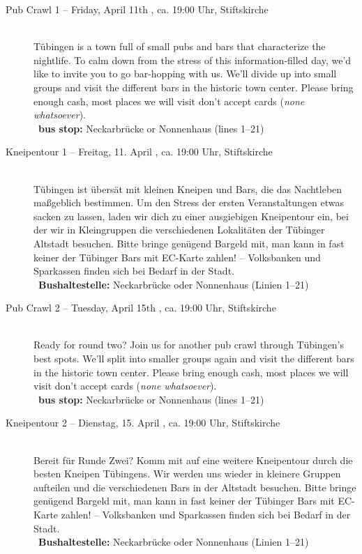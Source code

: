 \begin{description}
\ifmaster \iflehramt \pagebreak \fi \fi
\ifmaster \ifkogwiss \pagebreak \fi \fi

\ifml
    \item[Pub Crawl 1 -- Friday, April 11th \YEAR, ca. 19:00 Uhr, Stiftskirche]~\\
    Tübingen is a town full of small pubs and bars that characterize the nightlife.
    To calm down from the stress of this information-filled day, we'd like to invite you to go bar-hopping with us.
    We'll divide up into small groups and visit the different bars in the historic town center.
    Please bring enough cash, most places we will visit don't accept cards (\emph{none whatsoever}). \\
    ~\textbf{bus stop:} Neckarbrücke or Nonnenhaus (lines 1--21)
\else
    \item[Kneipentour 1 -- Freitag, 11. April \YEAR, ca. 19:00 Uhr, Stiftskirche]~\\
    Tübingen ist übersät mit kleinen Kneipen und Bars, die das Nachtleben maßgeblich bestimmen.
    Um den Stress der ersten Veranstaltungen etwas sacken zu lassen, laden wir dich zu einer ausgiebigen Kneipentour ein,
    bei der wir in Kleingruppen die verschiedenen Lokalitäten der Tübinger Altstadt besuchen.
    Bitte bringe genügend Bargeld mit, man kann in fast keiner der Tübinger Bars mit EC-Karte zahlen! -- Volksbanken und Sparkassen finden sich bei Bedarf in der Stadt.\\
   ~\textbf{Bushaltestelle:} Neckarbrücke oder Nonnenhaus (Linien 1--21)
\fi

\ifml
\item[Pub Crawl 2 -- Tuesday, April 15th \YEAR, ca. 19:00 Uhr, Stiftskirche]~\\
    Ready for round two? Join us for another pub crawl through Tübingen's best spots.
    We'll split into smaller groups again and visit the different bars in the historic town center.
    Please bring enough cash, most places we will visit don't accept cards (\emph{none whatsoever}).\\
   ~\textbf{bus stop:} Neckarbrücke or Nonnenhaus (lines 1--21)
\else
\item[Kneipentour 2 -- Dienstag, 15. April \YEAR, ca. 19:00 Uhr, Stiftskirche]~\\
    Bereit für Runde Zwei? Komm mit auf eine weitere Kneipentour durch die besten Kneipen Tübingens.
    Wir werden uns wieder in kleinere Gruppen aufteilen und die verschiedenen Bars in der Altstadt besuchen.
    Bitte bringe genügend Bargeld mit, man kann in fast keiner der Tübinger Bars mit EC-Karte zahlen! -- Volksbanken und Sparkassen finden sich bei Bedarf in der Stadt.\\
   ~\textbf{Bushaltestelle:} Neckarbrücke oder Nonnenhaus (Linien 1--21)
\fi


\end{description}
